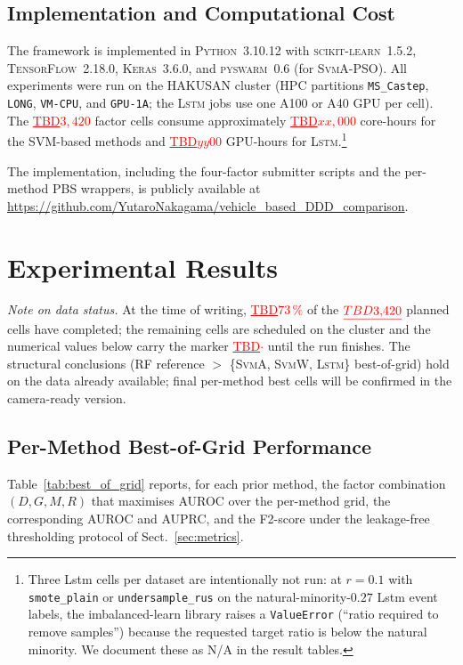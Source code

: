 \documentclass[lettersize,journal]{IEEEtran}
\newcommand{\Impl}[1]{\textsc{#1}}
\newcommand{\TBD}[1]{\textcolor{red}{\underline{TBD#1}}}
\begin{document}
\subsection{Implementation and Computational Cost}\label{sec:impl}
The framework is implemented in \Impl{Python}~3.10.12 with \Impl{scikit-learn}~1.5.2, \Impl{TensorFlow}~2.18.0, \Impl{Keras}~3.6.0, and \Impl{pyswarm}~0.6 (for \Impl{SvmA}-PSO).
All experiments were run on the HAKUSAN cluster (HPC partitions \texttt{MS\_Castep}, \texttt{LONG}, \texttt{VM-CPU}, and \texttt{GPU-1A}; the \Impl{Lstm} jobs use one A100 or A40 GPU per cell).
The \TBD{$3{,}420$} factor cells consume approximately \TBD{$xx{,}000$} core-hours for the SVM-based methods and \TBD{$yy00$} GPU-hours for \Impl{Lstm}.\footnote{Three Lstm cells per dataset are intentionally not run: at $r{=}0.1$ with \texttt{smote\_plain} or \texttt{undersample\_rus} on the natural-minority-$0.27$ Lstm event labels, the imbalanced-learn library raises a \texttt{ValueError} (``ratio required to remove samples'') because the requested target ratio is below the natural minority. We document these as N/A in the result tables.}

The implementation, including the four-factor submitter scripts and the per-method PBS wrappers, is publicly available at \url{https://github.com/YutaroNakagama/vehicle_based_DDD_comparison}.

\section{Experimental Results}
\label{sec:experiments}

\textit{Note on data status.}
At the time of writing, \TBD{$73\,\%$} of the $\TBD{3{,}420}$ planned cells have completed; the remaining cells are scheduled on the cluster and the numerical values below carry the marker \TBD{$\cdot$} until the run finishes.
The structural conclusions (\Impl{RF} reference $>$ \{\Impl{SvmA}, \Impl{SvmW}, \Impl{Lstm}\} best-of-grid) hold on the data already available; final per-method best cells will be confirmed in the camera-ready version.

\subsection{Per-Method Best-of-Grid Performance}\label{sec:best_of_grid}
Table~\ref{tab:best_of_grid} reports, for each prior method, the factor combination $(D, G, M, R)$ that maximises AUROC over the per-method grid, the corresponding AUROC and AUPRC, and the F2-score under the leakage-free thresholding protocol of Sect.~\ref{sec:metrics}.
\end{document}
